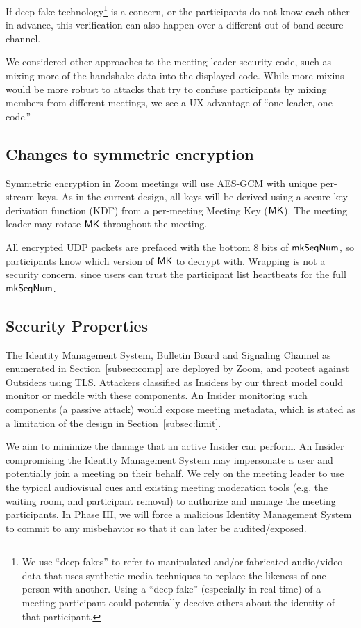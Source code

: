 If deep fake technology\footnote{We use ``deep fakes'' to refer to manipulated and/or fabricated audio/video data that uses synthetic media techniques to replace the likeness of one person with another. Using a ``deep fake'' (especially in real-time) of a meeting participant could potentially deceive others about the identity of that participant.} is a concern, or the participants do not know each other in advance, this verification can also happen over a different out-of-band secure channel.

We considered other approaches to the meeting leader security code, such as mixing more of the handshake data into the displayed code. While more mixins would be more robust to attacks that try to confuse participants by mixing members from different meetings, we see a UX advantage of ``one leader, one code.''

\subsection{Changes to symmetric encryption}
Symmetric encryption in Zoom meetings will use AES-GCM with unique per-stream keys. As in the current design, all keys will be derived using a secure key derivation function (KDF) from a per-meeting Meeting Key (${\sf MK}$). The meeting leader may rotate ${\sf MK}$ throughout the meeting.

All encrypted UDP packets are prefaced with the bottom 8 bits of $\mathsf{mkSeqNum}$, so participants know which version of ${\sf MK}$ to decrypt with. Wrapping is not a security concern, since users can trust the participant list heartbeats for the full $\mathsf{mkSeqNum}$.

\subsection{Security Properties}
\label{subsec:secprop}
The Identity Management System, Bulletin Board and Signaling Channel as enumerated in Section~\ref{subsec:comp} are deployed by Zoom, and protect against Outsiders using TLS. Attackers classified as Insiders by our threat model could monitor or meddle with these components. An Insider monitoring such components (a passive attack) would expose meeting metadata, which is stated as a limitation of the design in Section~\ref{subsec:limit}.

We aim to minimize the damage that an active Insider can perform. An Insider compromising the Identity Management System may impersonate a user and potentially join a meeting on their behalf. We rely on the meeting leader to use the typical audiovisual cues and existing meeting moderation tools (e.g. the waiting room, and participant removal) to authorize and manage the meeting participants. In Phase III, we will force a malicious Identity Management System to commit to any misbehavior so that it can later be audited/exposed.

